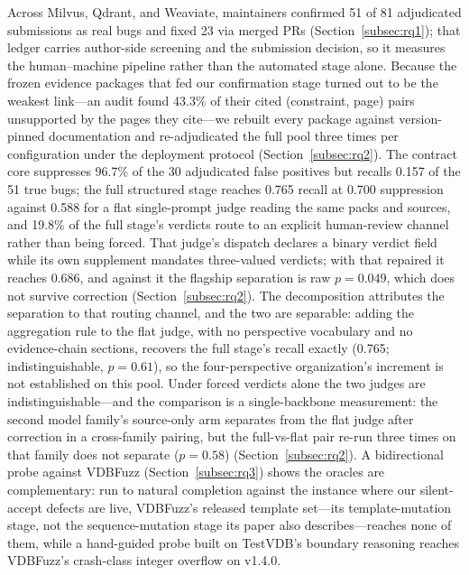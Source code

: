 \documentclass[acmsmall,screen,review,anonymous]{acmart}
\newcommand{\system}{TestVDB}
\begin{document}
Across Milvus, Qdrant, and Weaviate, maintainers confirmed 51 of 81 adjudicated submissions as real bugs and fixed 23 via merged PRs (Section~\ref{subsec:rq1}); that ledger carries author-side screening and the submission decision, so it measures the human--machine pipeline rather than the automated stage alone. Because the frozen evidence packages that fed our confirmation stage turned out to be the weakest link---an audit found 43.3\% of their cited (constraint, page) pairs unsupported by the pages they cite---we rebuilt every package against version-pinned documentation and re-adjudicated the full pool three times per configuration under the deployment protocol (Section~\ref{subsec:rq2}). The contract core suppresses 96.7\% of the 30 adjudicated false positives but recalls 0.157 of the 51 true bugs; the full structured stage reaches 0.765 recall at 0.700 suppression against 0.588 for a flat single-prompt judge reading the same packs and sources, and 19.8\% of the full stage's verdicts route to an explicit human-review channel rather than being forced. That judge's dispatch declares a binary verdict field while its own supplement mandates three-valued verdicts; with that repaired it reaches 0.686, and against it the flagship separation is raw $p{=}0.049$, which does not survive correction (Section~\ref{subsec:rq2}). The decomposition attributes the separation to that routing channel, and the two are separable: adding the aggregation rule to the flat judge, with no perspective vocabulary and no evidence-chain sections, recovers the full stage's recall exactly (0.765; indistinguishable, $p{=}0.61$), so the four-perspective organization's increment is not established on this pool. Under forced verdicts alone the two judges are indistinguishable---and the comparison is a single-backbone measurement: the second model family's source-only arm separates from the flat judge after correction in a cross-family pairing, but the full-vs-flat pair re-run three times on that family does not separate ($p{=}0.58$) (Section~\ref{subsec:rq2}). A bidirectional probe against VDBFuzz (Section~\ref{subsec:rq3}) shows the oracles are complementary: run to natural completion against the instance where our silent-accept defects are live, VDBFuzz's released template set---its template-mutation stage, not the sequence-mutation stage its paper also describes---reaches none of them, while a hand-guided probe built on \system{}'s boundary reasoning reaches VDBFuzz's crash-class integer overflow on v1.4.0.
\end{document}
